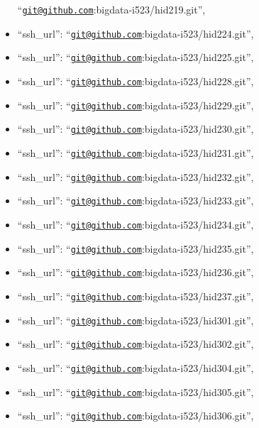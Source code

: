 \begin{itemize}
  ``\href{mailto:git@github.com}{\nolinkurl{git@github.com}}:bigdata-i523/hid219.git'',
\item
  ``ssh\_url'':
  ``\href{mailto:git@github.com}{\nolinkurl{git@github.com}}:bigdata-i523/hid224.git'',
\item
  ``ssh\_url'':
  ``\href{mailto:git@github.com}{\nolinkurl{git@github.com}}:bigdata-i523/hid225.git'',
\item
  ``ssh\_url'':
  ``\href{mailto:git@github.com}{\nolinkurl{git@github.com}}:bigdata-i523/hid228.git'',
\item
  ``ssh\_url'':
  ``\href{mailto:git@github.com}{\nolinkurl{git@github.com}}:bigdata-i523/hid229.git'',
\item
  ``ssh\_url'':
  ``\href{mailto:git@github.com}{\nolinkurl{git@github.com}}:bigdata-i523/hid230.git'',
\item
  ``ssh\_url'':
  ``\href{mailto:git@github.com}{\nolinkurl{git@github.com}}:bigdata-i523/hid231.git'',
\item
  ``ssh\_url'':
  ``\href{mailto:git@github.com}{\nolinkurl{git@github.com}}:bigdata-i523/hid232.git'',
\item
  ``ssh\_url'':
  ``\href{mailto:git@github.com}{\nolinkurl{git@github.com}}:bigdata-i523/hid233.git'',
\item
  ``ssh\_url'':
  ``\href{mailto:git@github.com}{\nolinkurl{git@github.com}}:bigdata-i523/hid234.git'',
\item
  ``ssh\_url'':
  ``\href{mailto:git@github.com}{\nolinkurl{git@github.com}}:bigdata-i523/hid235.git'',
\item
  ``ssh\_url'':
  ``\href{mailto:git@github.com}{\nolinkurl{git@github.com}}:bigdata-i523/hid236.git'',
\item
  ``ssh\_url'':
  ``\href{mailto:git@github.com}{\nolinkurl{git@github.com}}:bigdata-i523/hid237.git'',
\item
  ``ssh\_url'':
  ``\href{mailto:git@github.com}{\nolinkurl{git@github.com}}:bigdata-i523/hid301.git'',
\item
  ``ssh\_url'':
  ``\href{mailto:git@github.com}{\nolinkurl{git@github.com}}:bigdata-i523/hid302.git'',
\item
  ``ssh\_url'':
  ``\href{mailto:git@github.com}{\nolinkurl{git@github.com}}:bigdata-i523/hid304.git'',
\item
  ``ssh\_url'':
  ``\href{mailto:git@github.com}{\nolinkurl{git@github.com}}:bigdata-i523/hid305.git'',
\item
  ``ssh\_url'':
  ``\href{mailto:git@github.com}{\nolinkurl{git@github.com}}:bigdata-i523/hid306.git'',

\end{itemize}
